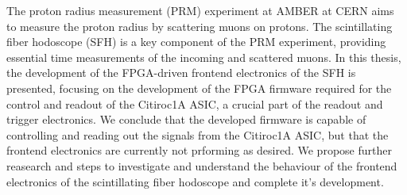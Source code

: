 The proton radius measurement (PRM) experiment at AMBER at CERN aims to measure the proton radius by scattering muons on protons.
The scintillating fiber hodoscope (SFH) is a key component of the PRM experiment, providing essential time measurements of the incoming and scattered muons.
In this thesis, the development of the FPGA-driven frontend electronics of the SFH is presented,
focusing on the development of the FPGA firmware required for the control and readout of the Citiroc1A ASIC, a crucial part of the readout and trigger electronics.
We conclude that the developed firmware is capable of controlling and reading out the signals from the Citiroc1A ASIC,
but that the frontend electronics are currently not prforming as desired.
We propose further reasearch and steps to investigate and understand the behaviour of the frontend electronics of the scintillating fiber hodoscope and complete it's development.
